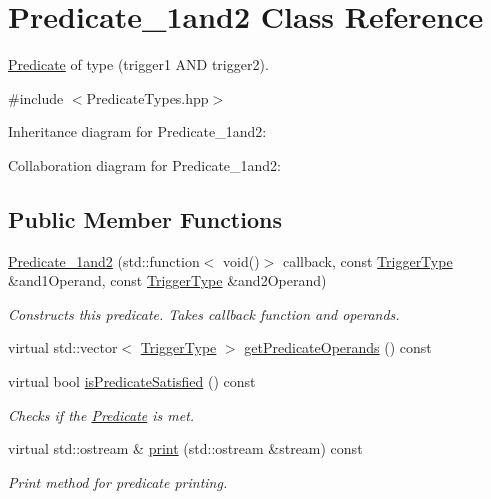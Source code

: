 \hypertarget{classPredicate__1and2}{}\section{Predicate\+\_\+1and2 Class Reference}
\label{classPredicate__1and2}


\hyperlink{classPredicate}{Predicate} of type (trigger1 A\+ND trigger2).  




{\ttfamily \#include $<$Predicate\+Types.\+hpp$>$}



Inheritance diagram for Predicate\+\_\+1and2\+:


Collaboration diagram for Predicate\+\_\+1and2\+:
\subsection*{Public Member Functions}
\begin{DoxyCompactItemize}
\item 
\hyperlink{classPredicate__1and2_a7fad2d370e96c46d9bcf2bb325c084cb}{Predicate\+\_\+1and2} (std\+::function$<$ void()$>$ callback, const \hyperlink{structTriggerType}{Trigger\+Type} \&and1\+Operand, const \hyperlink{structTriggerType}{Trigger\+Type} \&and2\+Operand)\hypertarget{classPredicate__1and2_a7fad2d370e96c46d9bcf2bb325c084cb}{}\label{classPredicate__1and2_a7fad2d370e96c46d9bcf2bb325c084cb}

\begin{DoxyCompactList}\small\item\em Constructs this predicate. Takes callback function and operands. \end{DoxyCompactList}\item 
virtual std\+::vector$<$ \hyperlink{structTriggerType}{Trigger\+Type} $>$ \hyperlink{classPredicate__1and2_ab9c037b965689cf9d06448632bee3cb1}{get\+Predicate\+Operands} () const 
\item 
virtual bool \hyperlink{classPredicate__1and2_a40454b823fe2c0d9dce1501b85050cef}{is\+Predicate\+Satisfied} () const \hypertarget{classPredicate__1and2_a40454b823fe2c0d9dce1501b85050cef}{}\label{classPredicate__1and2_a40454b823fe2c0d9dce1501b85050cef}

\begin{DoxyCompactList}\small\item\em Checks if the \hyperlink{classPredicate}{Predicate} is met. \end{DoxyCompactList}\item 
virtual std\+::ostream \& \hyperlink{classPredicate__1and2_a75f2c6984a63a7eb955749b54e7e8985}{print} (std\+::ostream \&stream) const \hypertarget{classPredicate__1and2_a75f2c6984a63a7eb955749b54e7e8985}{}\label{classPredicate__1and2_a75f2c6984a63a7eb955749b54e7e8985}

\begin{DoxyCompactList}\small\item\em Print method for predicate printing. \end{DoxyCompactList}\end{DoxyCompactItemize}
